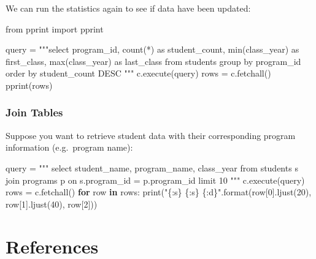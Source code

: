 \documentclass[
  letterpaper,
]{scrbook}
\newenvironment{Shaded}{\begin{snugshade}}{\end{snugshade}}
\newcommand{\BuiltInTok}[1]{\textcolor[rgb]{0.00,0.23,0.31}{#1}}
\newcommand{\ControlFlowTok}[1]{\textcolor[rgb]{0.00,0.23,0.31}{\textbf{#1}}}
\newcommand{\DecValTok}[1]{\textcolor[rgb]{0.68,0.00,0.00}{#1}}
\newcommand{\ImportTok}[1]{\textcolor[rgb]{0.00,0.46,0.62}{#1}}
\newcommand{\KeywordTok}[1]{\textcolor[rgb]{0.00,0.23,0.31}{\textbf{#1}}}
\newcommand{\NormalTok}[1]{\textcolor[rgb]{0.00,0.23,0.31}{#1}}
\newcommand{\OperatorTok}[1]{\textcolor[rgb]{0.37,0.37,0.37}{#1}}
\newcommand{\SpecialCharTok}[1]{\textcolor[rgb]{0.37,0.37,0.37}{#1}}
\newcommand{\StringTok}[1]{\textcolor[rgb]{0.13,0.47,0.30}{#1}}
\begin{document}
We can run the statistics again to see if data have been updated:

\begin{Shaded}
\begin{Highlighting}[]
\ImportTok{from}\NormalTok{ pprint }\ImportTok{import}\NormalTok{ pprint}

\NormalTok{query }\OperatorTok{=} \StringTok{"""select program\_id, }
\StringTok{       count(*) as student\_count, }
\StringTok{       min(class\_year) as first\_class, }
\StringTok{       max(class\_year) as last\_class}
\StringTok{from students }
\StringTok{group by program\_id}
\StringTok{order by student\_count DESC}
\StringTok{"""}
\NormalTok{c.execute(query)}
\NormalTok{rows }\OperatorTok{=}\NormalTok{ c.fetchall()}
\NormalTok{pprint(rows)}
\end{Highlighting}
\end{Shaded}

\subsection*{Join Tables}\label{join-tables-1}

Suppose you want to retrieve student data with their corresponding
program information (e.g.~program name):

\begin{Shaded}
\begin{Highlighting}[]
\NormalTok{query }\OperatorTok{=} \StringTok{"""}
\StringTok{    select student\_name, program\_name, class\_year}
\StringTok{    from students s join programs p }
\StringTok{         on s.program\_id = p.program\_id}
\StringTok{    limit 10}
\StringTok{"""}
\NormalTok{c.execute(query)}
\NormalTok{rows }\OperatorTok{=}\NormalTok{ c.fetchall()}
\ControlFlowTok{for}\NormalTok{ row }\KeywordTok{in}\NormalTok{ rows: }
    \BuiltInTok{print}\NormalTok{(}\StringTok{"}\SpecialCharTok{\{:s\}}\StringTok{ }\SpecialCharTok{\{:s\}}\StringTok{ }\SpecialCharTok{\{:d\}}\StringTok{"}\NormalTok{.}\BuiltInTok{format}\NormalTok{(row[}\DecValTok{0}\NormalTok{].ljust(}\DecValTok{20}\NormalTok{), row[}\DecValTok{1}\NormalTok{].ljust(}\DecValTok{40}\NormalTok{), row[}\DecValTok{2}\NormalTok{]))}
\end{Highlighting}
\end{Shaded}

\chapter*{References}\label{references-6}
\end{document}
